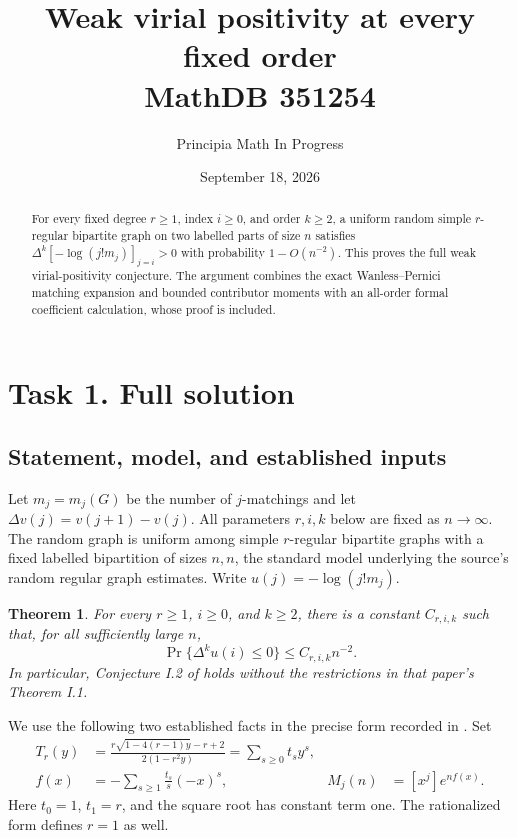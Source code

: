 \documentclass[11pt]{article}
\title{Weak virial positivity at every fixed order\\\large MathDB 351254}
\author{Principia Math In Progress}
\date{September 18, 2026}
\newtheorem{theorem}{Theorem}
\begin{document}
\maketitle
\begin{abstract}
For every fixed degree $r\ge1$, index $i\ge0$, and order $k\ge2$,
a uniform random simple $r$-regular bipartite graph on two labelled
parts of size $n$ satisfies $\Delta^k[-\log(j!m_j)]_{j=i}>0$ with
probability $1-O(n^{-2})$. This proves the full weak virial-positivity
conjecture. The argument combines the exact Wanless--Pernici matching
expansion and bounded contributor moments with an all-order formal
coefficient calculation, whose proof is included.
\end{abstract}

\section*{Task 1. Full solution}
\subsection*{Statement, model, and established inputs}
Let $m_j=m_j(G)$ be the number of $j$-matchings and let
$\Delta v(j)=v(j+1)-v(j)$. All parameters $r,i,k$ below are fixed
as $n\to\infty$. The random graph is uniform among simple
$r$-regular bipartite graphs with a fixed labelled bipartition of
sizes $n,n$, the standard model underlying the source's random
regular graph estimates. Write $u(j)=-\log(j!m_j)$.

\begin{theorem}\label{thm:main}
For every $r\ge1$, $i\ge0$, and $k\ge2$, there is a constant
$C_{r,i,k}$ such that, for all sufficiently large $n$,
\[
 \Pr\{\Delta^k u(i)\le0\}\le C_{r,i,k}n^{-2}.
\]
In particular, Conjecture I.2 of \cite{virial} holds without the
restrictions in that paper's Theorem I.1.
\end{theorem}

We use the following two established facts in the precise form
recorded in \cite[Section 3, equations (3.1)--(3.10)]{graph}.
Set
\begin{align}
 T_r(y)&=\frac{r\sqrt{1-4(r-1)y}-r+2}{2(1-r^2y)}
        =\sum_{s\ge0}t_s y^s,\label{eq:T}\\
 f(x)&=-\sum_{s\ge1}\frac{t_s}{s}(-x)^s,
 &M_j(n)&=[x^j]e^{nf(x)}.\label{eq:M}
\end{align}
Here $t_0=1$, $t_1=r$, and the square root has constant term one.
The rationalized form defines $r=1$ as well.
\end{document}
